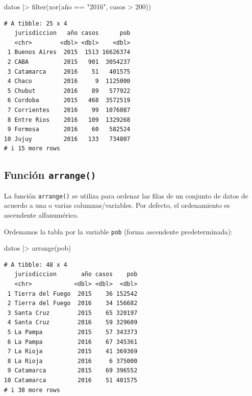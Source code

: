 \documentclass[
  spanish,
  letterpaper,
  DIV=11,
  numbers=noendperiod]{scrreprt}
\newenvironment{Shaded}{\begin{snugshade}}{\end{snugshade}}
\newcommand{\DecValTok}[1]{\textcolor[rgb]{0.68,0.00,0.00}{#1}}
\newcommand{\FunctionTok}[1]{\textcolor[rgb]{0.28,0.35,0.67}{#1}}
\newcommand{\NormalTok}[1]{\textcolor[rgb]{0.00,0.23,0.31}{#1}}
\newcommand{\SpecialCharTok}[1]{\textcolor[rgb]{0.37,0.37,0.37}{#1}}
\newcommand{\StringTok}[1]{\textcolor[rgb]{0.13,0.47,0.30}{#1}}
\begin{document}
\begin{Shaded}
\begin{Highlighting}[]
\NormalTok{datos }\SpecialCharTok{|\textgreater{}}
  \FunctionTok{filter}\NormalTok{(}\FunctionTok{xor}\NormalTok{(año }\SpecialCharTok{==} \StringTok{"2016"}\NormalTok{, casos }\SpecialCharTok{\textgreater{}} \DecValTok{200}\NormalTok{))}
\end{Highlighting}
\end{Shaded}

\begin{verbatim}
# A tibble: 25 x 4
   jurisdiccion   año casos      pob
   <chr>        <dbl> <dbl>    <dbl>
 1 Buenos Aires  2015  1513 16626374
 2 CABA          2015   901  3054237
 3 Catamarca     2016    51   401575
 4 Chaco         2016     9  1125000
 5 Chubut        2016    89   577922
 6 Cordoba       2015   468  3572519
 7 Corrientes    2016    99  1076087
 8 Entre Rios    2016   109  1329268
 9 Formosa       2016    60   582524
10 Jujuy         2016   133   734807
# i 15 more rows
\end{verbatim}

\subsection{\texorpdfstring{Función
\texttt{arrange()}}{Función arrange()}}\label{funciuxf3n-arrange}

La función \texttt{arrange()} se utiliza para ordenar las filas de un
conjunto de datos de acuerdo a una o varias columnas/variables. Por
defecto, el ordenamiento es ascendente alfanumérico.

Ordenamos la tabla por la variable \texttt{pob} (forma ascendente
predeterminada):

\begin{Shaded}
\begin{Highlighting}[]
\NormalTok{datos }\SpecialCharTok{|\textgreater{}}
  \FunctionTok{arrange}\NormalTok{(pob)}
\end{Highlighting}
\end{Shaded}

\begin{verbatim}
# A tibble: 48 x 4
   jurisdiccion       año casos    pob
   <chr>            <dbl> <dbl>  <dbl>
 1 Tierra del Fuego  2015    36 152542
 2 Tierra del Fuego  2016    34 156682
 3 Santa Cruz        2015    65 320197
 4 Santa Cruz        2016    59 329609
 5 La Pampa          2015    57 343373
 6 La Pampa          2016    67 345361
 7 La Rioja          2015    41 369369
 8 La Rioja          2016     6 375000
 9 Catamarca         2015    69 396552
10 Catamarca         2016    51 401575
# i 38 more rows
\end{verbatim}
\end{document}
